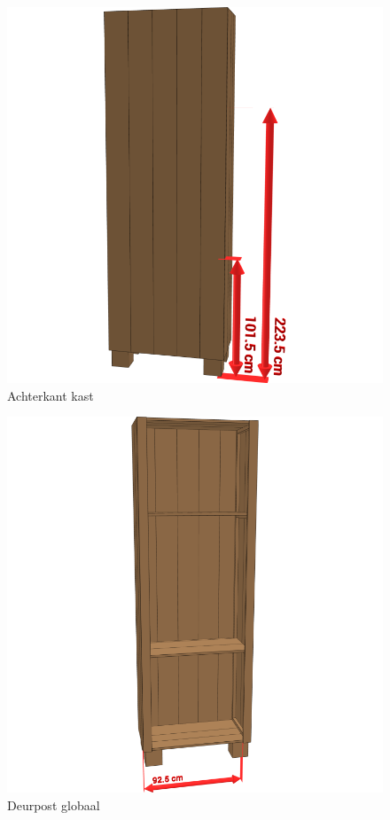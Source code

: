 \documentclass{article}
\begin{document}
\begin{figure}[h!]
    \centering
    \includegraphics[width=\textwidth]{scene 9 - achterkant.png}
    \caption{Achterkant kast}
\end{figure}

\begin{figure}[h!]
    \centering
    \includegraphics[width=\textwidth]{scene 10 - deurpost a.png}
    \caption{Deurpost globaal}
\end{figure}
\end{document}
